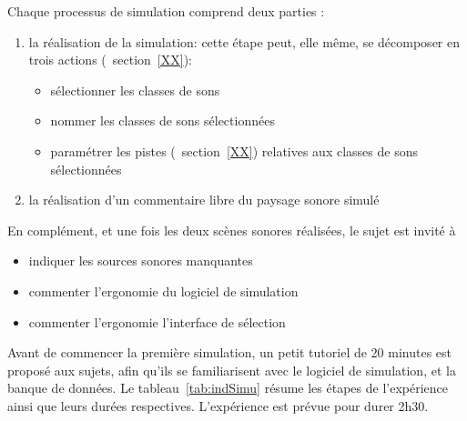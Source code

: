 Chaque processus de simulation comprend deux parties :

\begin{enumerate}
\item la réalisation de la simulation: cette étape peut, elle même, se décomposer en trois actions (\Cf~section~\ref{XX}):
\begin{itemize}
\item sélectionner les classes de sons
\item nommer les classes de sons sélectionnées
\item paramétrer les pistes (\Cf~section~\ref{XX}) relatives aux classes de sons sélectionnées
\end{itemize}
\item la réalisation d'un commentaire libre du paysage sonore simulé
\end{enumerate}

En complément, et une fois les deux scènes sonores réalisées, le sujet est invité à 

\begin{itemize}
\item indiquer les sources sonores manquantes
\item commenter l’ergonomie du logiciel de simulation
\item commenter l’ergonomie  l'interface de sélection
\end{itemize}

Avant de commencer la première simulation, un petit tutoriel de 20 minutes est proposé aux sujets, afin qu'ils se familiarisent avec le logiciel de simulation, et la banque de données. Le tableau~\ref{tab:indSimu} résume les étapes de l’expérience ainsi que leurs durées respectives. L'expérience est prévue pour durer 2h30. \\

